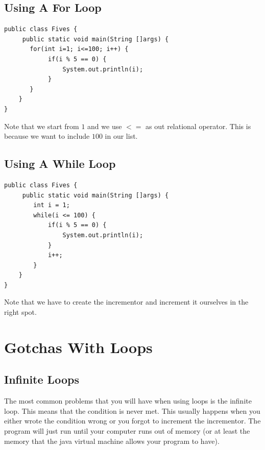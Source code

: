 \documentclass[11]{article}
\begin{document}
\subsection{Using A For Loop}

\begin{lstlisting}
public class Fives {
     public static void main(String []args) {
       for(int i=1; i<=100; i++) {
            if(i % 5 == 0) {
                System.out.println(i);
            }
       }
    }
}
\end{lstlisting}

Note that we start from $1$ and we use $<=$ as out relational operator. This is because we want to include $100$ in our list.

\subsection{Using A While Loop}

\begin{lstlisting}
public class Fives {
     public static void main(String []args) {
        int i = 1;
        while(i <= 100) {
            if(i % 5 == 0) {
                System.out.println(i);
            }
            i++;
        }
    }
}
\end{lstlisting}

Note that we have to create the incrementor and increment it ourselves in the right spot.

\section{Gotchas With Loops}
\subsection{Infinite Loops}
The most common problems that you will have when using loops is the infinite loop. This means that the condition is never met. This usually happens when you either wrote the condition wrong or you forgot to increment the incrementor. The program will just run until your computer runs out of memory (or at least the memory that the java virtual machine allows your program to have).
\end{document}
